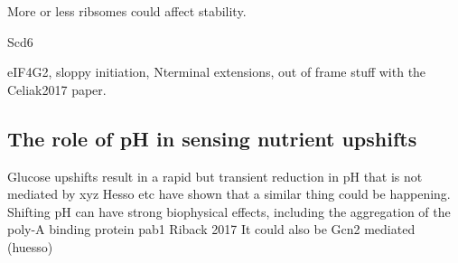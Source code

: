More or less ribsomes could affect stability.

Scd6

eIF4G2, sloppy initiation, Nterminal extensions, out of frame stuff
with the Celiak2017 paper.

\subsection{The role of pH in sensing nutrient upshifts}

Glucose upshifts result in a rapid but transient reduction in pH
that is not mediated by xyz
\parencite{kresnowati2008quantitative}
Hesso etc have shown that a similar thing could be happening.
Shifting pH can have strong biophysical effects, including
the aggregation of the poly-A binding protein pab1
Riback 2017
It could also be Gcn2 mediated (huesso)

